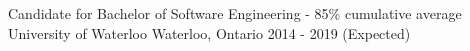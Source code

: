 


\begin{cventries}


\cventry
{Candidate for Bachelor of Software Engineering - 85\% cumulative average} %
{University of Waterloo}
{Waterloo, Ontario} %
    {2014 - 2019 (Expected)} %
{ %
}


\end{cventries}
